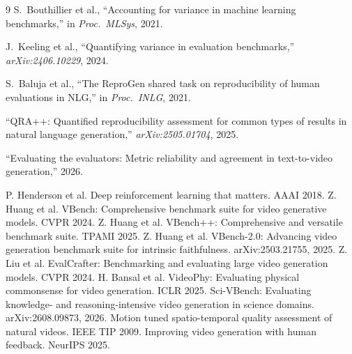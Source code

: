 \documentclass[10pt,twocolumn]{article}
\begin{document}

\begin{thebibliography}{9}
S.~Bouthillier et al., ``Accounting for variance in machine learning benchmarks,''
in \emph{Proc.\ MLSys}, 2021.

J.~Keeling et al., ``Quantifying variance in evaluation benchmarks,'' \emph{arXiv:2406.10229}, 2024.

S.~Baluja et al., ``The ReproGen shared task on reproducibility of human evaluations in NLG,'' in \emph{Proc.\ INLG}, 2021.

``QRA++: Quantified reproducibility assessment for common types of results in natural language generation,'' \emph{arXiv:2505.01704}, 2025.

``Evaluating the evaluators: Metric reliability and agreement in text-to-video generation,'' 2026.

 P. Henderson et al. Deep reinforcement learning that matters. AAAI 2018.
 Z. Huang et al. VBench: Comprehensive benchmark suite for video generative models. CVPR 2024.
 Z. Huang et al. VBench++: Comprehensive and versatile benchmark suite. TPAMI 2025.
 Z. Huang et al. VBench-2.0: Advancing video generation benchmark suite for intrinsic faithfulness. arXiv:2503.21755, 2025.
 Z. Liu et al. EvalCrafter: Benchmarking and evaluating large video generation models. CVPR 2024.
 H. Bansal et al. VideoPhy: Evaluating physical commonsense for video generation. ICLR 2025.
 Sci-VBench: Evaluating knowledge- and reasoning-intensive video generation in science domains. arXiv:2608.09873, 2026.
 Motion tuned spatio-temporal quality assessment of natural videos. IEEE TIP 2009.
 Improving video generation with human feedback. NeurIPS 2025.
\end{thebibliography}
\end{document}
